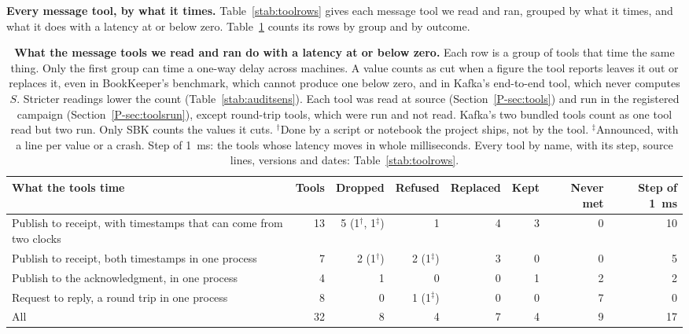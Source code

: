 \documentclass[10pt,journal,onecolumn]{IEEEtran}
\newcommand{\kafka}{Kafka}
\begin{document}
\textbf{Every message tool, by what it times.} Table~\ref{stab:toolrows} gives each message
tool we read and ran, grouped by what it times, and what it does with a latency at or below
zero. Table~\ref{stab:toolgroups} counts its rows by group and by outcome.

\begin{table}[tb]
\caption{\textbf{What the message tools we read and ran do with a latency at or below zero.} Each
row is a group of tools that time the same thing. Only the first group can time a one-way delay
across machines. A value counts as cut when a figure the tool reports leaves it out or replaces it,
even in BookKeeper's benchmark, which cannot produce one below zero, and in \kafka{}'s end-to-end
tool, which never computes $S$. Stricter readings lower the count (Table~\ref{stab:auditsens}).
Each tool was read at source (Section~\ref{P-sec:tools}) and run in the registered campaign
(Section~\ref{P-sec:toolsrun}), except \toolsRunNotReadWord{} round-trip tools, which were run and
not read. \kafka{}'s two bundled tools count as one tool read but two run. Only SBK counts the
values it cuts. $^\dagger$Done by a script or notebook the project ships, not by the tool.
$^\ddagger$Announced, with a line per value or a crash. Step of 1~ms: the tools whose latency moves
in whole milliseconds. Every tool by name, with its step, source lines, versions and dates:
Table~\ref{stab:toolrows}.}
\label{stab:toolgroups}
\centering
\footnotesize
\setlength{\tabcolsep}{4pt}
\begin{tabular}{@{}>{\raggedright\arraybackslash}p{}rrrrrrr@{}}
\toprule
What the tools time & Tools & Dropped & Refused & Replaced & Kept & Never met & Step of 1~ms \\
\midrule
Publish to receipt, with timestamps that can come from two clocks & 13 & 5 (1$^\dagger$,
1$^\ddagger$) & 1 & 4 & 3 & 0 & 10 \\
Publish to receipt, both timestamps in one process & 7 & 2 (1$^\dagger$) & 2 (1$^\ddagger$) & 3 & 0
& 0 & 5 \\
Publish to the acknowledgment, in one process & 4 & 1 & 0 & 0 & 1 & 2 & 2 \\
Request to reply, a round trip in one process & 8 & 0 & 1 (1$^\ddagger$) & 0 & 0 & 7 & 0 \\
\midrule
All & 32 & 8 & 4 & 7 & 4 & 9 & 17 \\
\bottomrule
\end{tabular}
\end{table}
\end{document}
